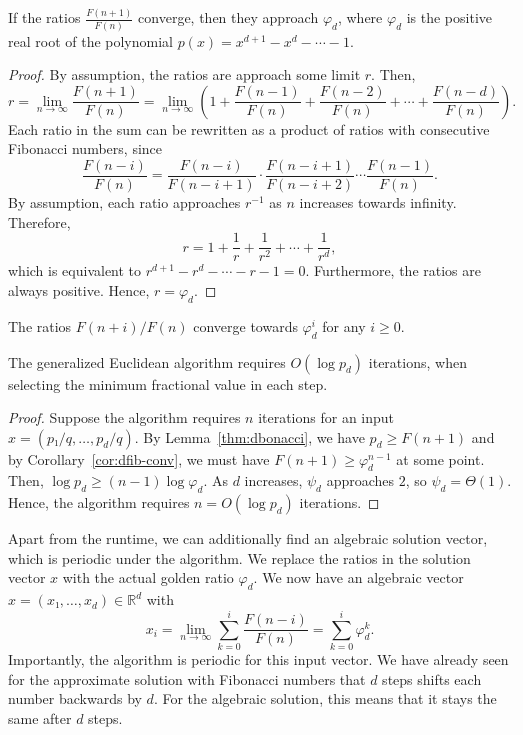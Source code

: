 \begin{theorem}
  If the ratios $\frac{F(n+1)}{F(n)}$ converge, then they approach $φ_d$,
  where $φ_d$ is the positive real root of the polynomial $p(x) = x^{d+1} - x^d - ⋯ - 1$.
\end{theorem}

\begin{proof}
  By assumption, the ratios are approach some limit $r$.
  Then,
  \[
    r
    = \lim_{n → ∞} \frac{F(n+1)}{F(n)}
    = \lim_{n → ∞} \left(1 + \frac{F(n-1)}{F(n)} + \frac{F(n-2)}{F(n)} + ⋯ + \frac{F(n-d)}{F(n)}\right).
  \]
  Each ratio in the sum can be rewritten as a product of ratios with
  consecutive Fibonacci numbers, since
  \[
    \frac{F(n - i)}{F(n)}
    = \frac{F(n - i)}{F(n - i + 1)} · \frac{F(n - i + 1)}{F(n - i + 2)} ⋯ \frac{F(n - 1)}{F(n)}.
  \]
  By assumption, each ratio approaches $r^{-1}$ as $n$ increases towards infinity.
  Therefore,
  \[
    r = 1 + \frac{1}{r} + \frac{1}{r^2} + ⋯ + \frac{1}{r^d},
  \]
  which is equivalent to $r^{d+1} - r^d - ⋯ - r - 1 = 0$.
  Furthermore, the ratios are always positive.
  Hence, $r = φ_d$.
\end{proof}

\begin{corollary}
  \label{cor:dfib-conv}
  The ratios $F(n + i)/F(n)$ converge towards $φ_d^i$ for any $i ≥ 0$.
\end{corollary}

\begin{theorem}
  The generalized Euclidean algorithm requires $O(\log p_d)$ iterations,
  when selecting the minimum fractional value in each step.
\end{theorem}

\begin{proof}
  Suppose the algorithm requires $n$ iterations for an input $x = (p₁/q, …, p_d/q)$.
  By Lemma~\ref{thm:dbonacci}, we have $p_d ≥ F(n+1)$
  and by Corollary~\ref{cor:dfib-conv}, we must have $F(n+1) ≥ φ_d^{n-1}$ at some point.
  Then, $\log p_d ≥ (n - 1) \log φ_d$.
  As $d$ increases, $ψ_d$ approaches $2$, so $ψ_d = Θ(1)$.
  Hence, the algorithm requires $n = O(\log p_d)$ iterations.
\end{proof}

Apart from the runtime, we can additionally find an algebraic solution vector,
which is periodic under the algorithm.
We replace the ratios in the solution vector $x$ with the actual golden ratio $φ_d$.
We now have an algebraic vector $x = (x₁, …, x_d) ∈ ℝ^d$ with
\[
  x_i
  = \lim_{n → ∞} \sum_{k=0}^i \frac{F(n - i)}{F(n)}
  = \sum_{k=0}^i φ_d^k.
\]
Importantly, the algorithm is periodic for this input vector.
We have already seen for the approximate solution with Fibonacci numbers
that $d$ steps shifts each number backwards by $d$.
For the algebraic solution, this means that it stays the same after $d$ steps.

